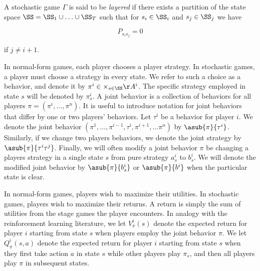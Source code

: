 \begin{mydef}
A stochastic game $\Gamma$ is said to be {\em layered} if there exists a partition of the state space $\SS = \SS_1 \cup \ldots \cup \SS_T$ such that for $s_i \in \SS_i$ and $s_j \in \SS_j$ we have

$$
P_{s_is_j} = 0
$$

if $j \neq i + 1$.
\end{mydef}


In normal-form games, each player chooses a player strategy. In stochastic games, a player must choose a strategy in every state. We refer to such a choice as a behavior, and denote it by $\pi^i \in \times_{s \in \SS} \AA^i$. The specific strategy employed in state $s$ will be denoted by $\pi^i_s$. A joint behavior is a collection of behaviors for all players $\pi = (\pi^i, \ldots, \pi^n)$. It is useful to introduce notation for joint behaviors that differ by one or two players' behaviors. Let $\tau^i$ be a behavior for player $i$. We denote the joint behavior $(\pi^1, \ldots, \pi^{i-1}, \tau^i, \pi^{i+1}, \ldots \pi^n)$ by $\asub{\pi}{\tau^i}$. Similarly, if we change two players behaviors, we denote the joint strategy by $\asub{\pi}{\tau^i\tau^j}$. Finally, we will often modify a joint behavior $\pi$ be changing a players strategy in a single state $s$ from pure strategy $a^i_s$ to $b^i_s$. We will denote the modified joint behavior by $\asub{\pi}{b^i_s}$ or $\asub{\pi}{b^i}$ when the particular state is clear.

In normal-form games, players wish to maximize their utilities. In stochastic games, players wish to maximize their returns. A return is simply the sum of utilities from the stage games the player encounters. In analogy with the reinforcement learning literature, we let $V^i_{\pi}(s)$ denote the expected return for player $i$ starting from state $s$ when players employ the joint behavior $\pi$. We let $Q^i_{\pi}(s, a)$ denote the expected return for player $i$ starting from state $s$ when they first take action $a$ in state $s$ while other players play $\pi_s$, and then all players play $\pi$ in subsequent states.













